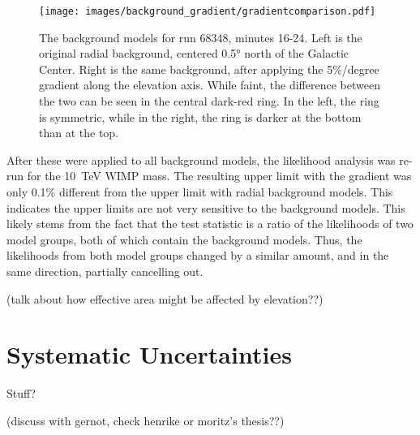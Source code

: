   \begin{figure}[ht]
    \centering
    \texttt{[image: images/background\_gradient/gradientcomparison.pdf]}
    \caption[Background Gradient Comparison]{
      The background models for run 68348, minutes 16-24.
      Left is the original radial background, centered \ang{0.5} north of the Galactic Center.
      Right is the same background, after applying the 5\%/degree gradient along the elevation axis.
      While faint, the difference between the two can be seen in the central dark-red ring.
      In the left, the ring is symmetric, while in the right, the ring is darker at the bottom than at the top.
    }
    \label{fig:bkg_flatvsgrad}
  \end{figure}
  
  After these were applied to all background models, the likelihood analysis was re-run for the \SI{10}{\TeV} WIMP mass.
  The resulting upper limit with the gradient was only 0.1\% different from the upper limit with radial background models.
  This indicates the upper limits are not very sensitive to the background models.
  This likely stems from the fact that the test statistic is a ratio of the likelihoods of two model groups, both of which contain the background models.
  Thus, the likelihoods from both model groups changed by a similar amount, and in the same direction, partially cancelling out.
  
  {\color{red}(talk about how effective area might be affected by elevation??)}

\section{Systematic Uncertainties}  

Stuff?

{\color{red}(discuss with gernot, check henrike or moritz's thesis??)}


